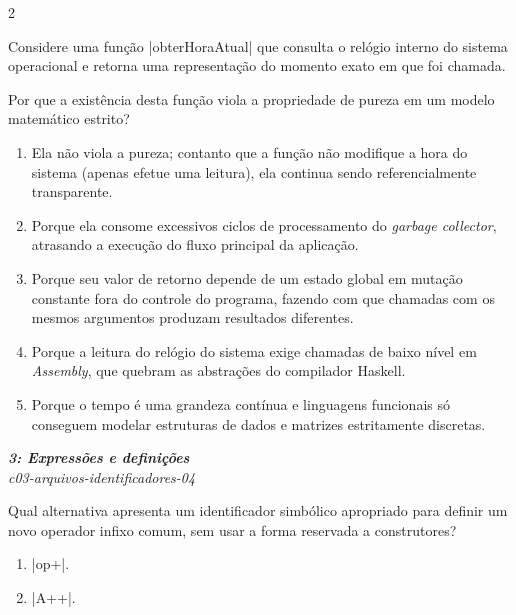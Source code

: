 \documentclass[a4paper,10pt,brazil]{article}
\begin{document}
\begin{multicols}{2}
\begin{flushright}
\end{flushright}
Considere uma função \haskellinline|obterHoraAtual| que consulta o relógio interno do sistema operacional e retorna uma representação do momento exato em que foi chamada.

Por que a existência desta função viola a propriedade de pureza em um modelo matemático estrito?

\begin{enumerate}
  \item Ela não viola a pureza; contanto que a função não modifique a hora do sistema (apenas efetue uma leitura), ela continua sendo referencialmente transparente.

  \item Porque ela consome excessivos ciclos de processamento do \emph{garbage collector}, atrasando a execução do fluxo principal da aplicação.

  \item Porque seu valor de retorno depende de um estado global em mutação constante fora do controle do programa, fazendo com que chamadas com os mesmos argumentos produzam resultados diferentes.

  \item Porque a leitura do relógio do sistema exige chamadas de baixo nível em \emph{Assembly}, que quebram as abstrações do compilador Haskell.

  \item Porque o tempo é uma grandeza contínua e linguagens funcionais só conseguem modelar estruturas de dados e matrizes estritamente discretas.


\end{enumerate}

\begin{flushright}
  \footnotesize
  \textit{\textbf{3: Expressões e definições}}\\
  \textit{c03-arquivos-identificadores-04}\\

\end{flushright}
Qual alternativa apresenta um identificador simbólico apropriado para definir um novo operador infixo comum, sem usar a forma reservada a construtores?

\begin{enumerate}
  \item \haskellinline|op+|.

  \item \haskellinline|A++|.


\end{enumerate}
\end{multicols}
\end{document}
